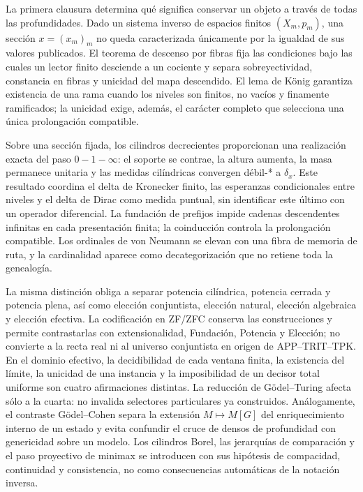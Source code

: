 La primera clausura determina qué significa conservar un objeto a través de
todas las profundidades. Dado un sistema inverso de espacios finitos
\((X_m,p_m)\), una sección \(x=(x_m)_m\) no queda caracterizada únicamente por
la igualdad de sus valores publicados. El teorema de descenso por fibras fija
las condiciones bajo las cuales un lector finito desciende a un cociente y
separa sobreyectividad, constancia en fibras y unicidad del mapa descendido.
El lema de K\"onig garantiza existencia de una rama cuando los niveles son
finitos, no vacíos y finamente ramificados; la unicidad exige, además, el
carácter completo que selecciona una única prolongación compatible.

Sobre una sección fijada, los cilindros decrecientes proporcionan una
realización exacta del paso \(0\!-1\!-\!\infty\): el soporte se contrae, la
altura aumenta, la masa permanece unitaria y las medidas cilíndricas convergen
débil-* a \(\delta_x\). Este resultado coordina el delta de Kronecker finito,
las esperanzas condicionales entre niveles y el delta de Dirac como medida
puntual, sin identificar este último con un operador diferencial. La
fundación de prefijos impide cadenas descendentes infinitas en cada
presentación finita; la coinducción controla la prolongación compatible. Los
ordinales de von Neumann se elevan con una fibra de memoria de ruta, y la
cardinalidad aparece como decategorización que no retiene toda la genealogía.

La misma distinción obliga a separar potencia cilíndrica, potencia cerrada y
potencia plena, así como elección conjuntista, elección natural, elección
algebraica y elección efectiva. La codificación en ZF/ZFC conserva las
construcciones y permite contrastarlas con extensionalidad, Fundación,
Potencia y Elección; no convierte a la recta real ni al universo conjuntista
en origen de APP--TRIT--TPK\@. En el dominio efectivo, la decidibilidad de cada
ventana finita, la existencia del límite, la unicidad de una instancia y la
imposibilidad de un decisor total uniforme son cuatro afirmaciones distintas.
La reducción de G\"odel--Turing afecta sólo a la cuarta: no invalida selectores
particulares ya construidos. Análogamente, el contraste G\"odel--Cohen separa
la extensión \(M\mapsto M[G]\) del enriquecimiento interno de un estado y
evita confundir el cruce de densos de profundidad con genericidad sobre un
modelo. Los cilindros Borel, las jerarquías de comparación y el paso
proyectivo de minimax se introducen con sus hipótesis de compacidad,
continuidad y consistencia, no como consecuencias automáticas de la notación
inversa.

